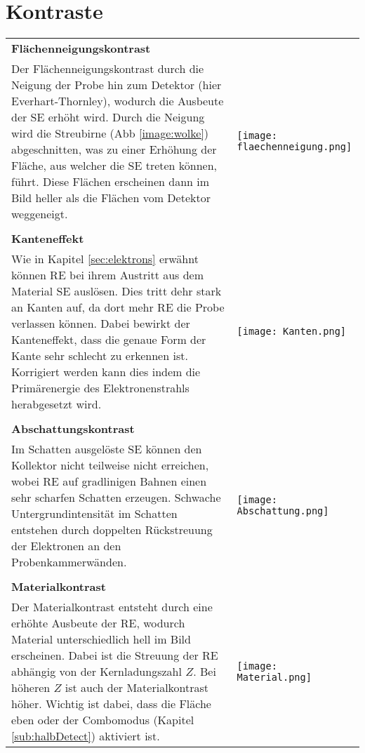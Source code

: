 \section{Kontraste}
\label{sec:kontrast}

\begin{tabular}{m{}m{}}
    \textbf{Flächenneigungskontrast} & {}\\
    Der Flächenneigungskontrast durch die Neigung der Probe hin zum Detektor (hier Everhart-Thornley), wodurch die Ausbeute der SE erhöht wird. Durch die Neigung wird die Streubirne (Abb \ref{image:wolke}) abgeschnitten, was zu einer Erhöhung der Fläche, aus welcher die SE treten können, führt. Diese Flächen erscheinen dann im Bild heller als die Flächen vom Detektor weggeneigt. & \texttt{[image: flaechenneigung.png]}\\
    {} & {}\\
    \textbf{Kanteneffekt} & {}\\
    Wie in Kapitel \ref{sec:elektrons} erwähnt können RE bei ihrem Austritt aus dem Material SE auslösen. Dies tritt dehr stark an Kanten auf, da dort mehr RE die Probe verlassen können. Dabei bewirkt der Kanteneffekt, dass die genaue Form der Kante sehr schlecht zu erkennen ist. Korrigiert werden kann dies indem die Primärenergie des Elektronenstrahls herabgesetzt wird. & \texttt{[image: Kanten.png]}\\
    {} & {}\\
    \textbf{Abschattungskontrast} & {}\\
    Im Schatten ausgelöste SE können den Kollektor nicht teilweise nicht erreichen, wobei RE auf gradlinigen Bahnen einen sehr scharfen Schatten erzeugen. Schwache Untergrundintensität im Schatten entstehen durch doppelten Rückstreuung der Elektronen an den Probenkammerwänden. & \texttt{[image: Abschattung.png]}\\
    {} & {}\\
    \textbf{Materialkontrast} & {}\\
    Der Materialkontrast entsteht durch eine erhöhte Ausbeute der RE, wodurch Material unterschiedlich hell im Bild erscheinen. Dabei ist die Streuung der RE abhängig von der Kernladungszahl $Z$. Bei höheren $Z$ ist auch der Materialkontrast höher. Wichtig ist dabei, dass die Fläche eben oder der Combomodus (Kapitel \ref{sub:halbDetect}) aktiviert ist. \citep{RasterEM} & \texttt{[image: Material.png]}
\end{tabular}